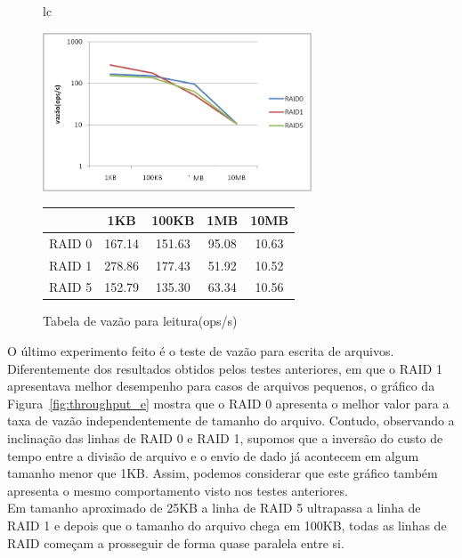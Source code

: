 	\begin{figure}[h]
		\begin{tabular}{lc}
			\begin{minipage}{.50\textwidth}
				\begin{center}
					
					\includegraphics[clip,width=8.0cm]{images/resultados/throughput_leitura.png}
					\caption{Gráfico de vazão para leitura(ops/s)}
					\label{fig:throughput_l}
					
				\end{center}
				
			\end{minipage}
			
			\begin{minipage}{.5\textwidth}
				\makeatletter
				\def\@captype{table}
				\makeatother
				\caption{Tabela de vazão para leitura(ops/s)}
				\label{tab:throughput_l}
				\begin{center}
					\begin{tabular}{|c|c|c|c|c|} \hline
						& 1KB & 100KB & 1MB & 10MB \\ \hline
						
						RAID 0	& 167.14 & 151.63 & 95.08 & 10.63\\ \hline
						RAID 1	& 278.86 & 177.43 & 51.92 & 10.52\\ \hline
						RAID 5	& 152.79 & 135.30 & 63.34 & 10.56\\ \hline
						
					\end{tabular}
				\end{center}
				
			\end{minipage}
		\end{tabular}
	\end{figure}
	
	
	O último experimento feito é o teste de vazão para escrita de arquivos.
	Diferentemente dos resultados obtidos pelos testes anteriores, em que o RAID 1 apresentava melhor desempenho para casos de arquivos pequenos, o gráfico da Figura~\ref{fig:throughput_e} mostra que o RAID 0 apresenta o melhor valor para a taxa de vazão independentemente de tamanho do arquivo. 
	Contudo, observando a inclinação das linhas de RAID 0 e RAID 1, supomos que a inversão do custo de tempo entre a divisão de arquivo e o envio de dado já acontecem em algum tamanho menor que 1KB. Assim, podemos considerar que este gráfico também apresenta o mesmo comportamento visto nos testes anteriores. 
	\\
	Em tamanho aproximado de 25KB a linha de RAID 5 ultrapassa a linha de RAID 1 e depois que o tamanho do arquivo chega em 100KB, todas as linhas de RAID começam a prosseguir de forma quase paralela entre si.
	\\
	

